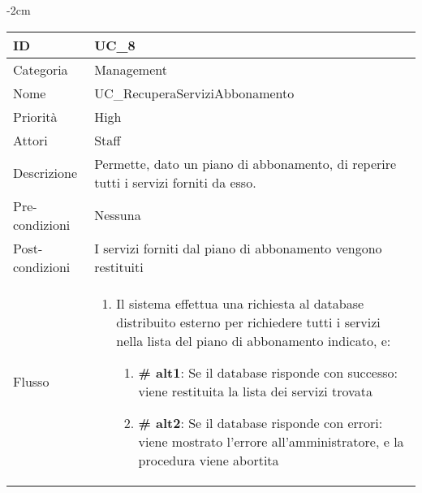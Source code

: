 \begin{center}
\begin{table}[bp]
    \centering
    \addtolength{\leftskip} {-2cm}
\begin{tabular}{ |p{2.6cm}|p{13cm}|  }
\hline
ID & UC\_8 \\\hline
Categoria & Management\\\hline
Nome & UC\_RecuperaServiziAbbonamento\\\hline
Priorità & High \\\hline
Attori &  Staff \\\hline
Descrizione & Permette, dato un piano di abbonamento, di reperire tutti i servizi forniti da esso.\\\hline
Pre-condizioni &  Nessuna\\\hline
Post-condizioni &  I servizi forniti dal piano di abbonamento vengono restituiti \\\hline
Flusso &  	\begin{enumerate}
			\item Il sistema effettua una richiesta al database distribuito esterno per richiedere tutti i servizi nella lista del piano di abbonamento indicato, e:
				\begin{enumerate}[  ]
				\item \textbf{\# alt1}: Se il database risponde con successo: viene restituita la lista dei servizi trovata
				\item \textbf{\# alt2}: Se il database risponde con errori: viene mostrato l'errore all'amministratore, e la procedura viene abortita
				\end{enumerate}
		\end{enumerate}\\\hline
\end{tabular}
\label{table_use_case:8}\newline
\end{table}


\end{center}
